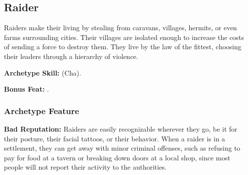 \subsection{Raider}
Raiders make their living by stealing from caravans, villages, hermits, or even farms surrounding cities. Their villages are isolated enough to increase the costs of sending a force to destroy them. They live by the law of the fittest, choosing their leaders through a hierarchy of violence.

\textbf{Archetype Skill:}  (Cha).

\textbf{Bonus Feat:} .

\subsubsection{Archetype Feature}
\textbf{Bad Reputation:} Raiders are easily recognizable wherever they go, be it for their posture, their facial tattoos, or their behavior. When a raider is in a settlement, they can get away with minor criminal offenses, such as refusing to pay for food at a tavern or breaking down doors at a local shop, since most people will not report their activity to the authorities.
